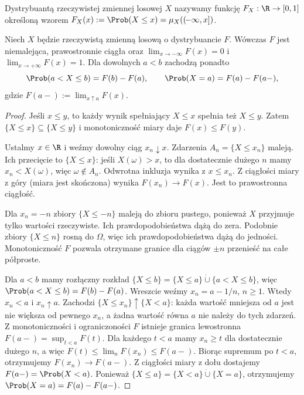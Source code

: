 \begin{definicja}
Dystrybuantą rzeczywistej zmiennej losowej $X$ nazywamy funkcję
$F_X:\R\to[0,1]$ określoną wzorem
$F_X(x):=\Prob(X\leq x)=\mu_X((\! -\infty,x])$.
\end{definicja}

\begin{twierdzenie}
Niech $X$ będzie rzeczywistą zmienną losową o dystrybuancie $F$.
Wówczas $F$ jest niemalejąca, prawostronnie ciągła oraz
$\lim_{x\to-\infty}F(x)=0$ i $\lim_{x\to+\infty}F(x)=1$.
Dla dowolnych $a<b$ zachodzą ponadto
\[
\Prob(a<X\leq b)=F(b)-F(a),\qquad
\Prob(X=a)=F(a)-F(a-),
\]
gdzie $F(a-):=\lim_{x\uparrow a}F(x)$.
\end{twierdzenie}
\begin{proof}
Jeśli $x\leq y$, to każdy wynik spełniający $X\leq x$
spełnia też $X\leq y$. Zatem
$\{X\leq x\}\subseteq\{X\leq y\}$ i monotoniczność
miary daje $F(x)\leq F(y)$.

Ustalmy $x\in\R$ i weźmy dowolny ciąg $x_n\downarrow x$.
Zdarzenia $A_n=\{X\leq x_n\}$ maleją. Ich przecięcie
to $\{X\leq x\}$: jeśli $X(\omega)>x$, to dla
dostatecznie dużego $n$ mamy $x_n<X(\omega)$,
więc $\omega\notin A_n$. Odwrotna inkluzja wynika z
$x\leq x_n$. Z ciągłości miary z góry (miara jest skończona)
wynika $F(x_n)\to F(x)$. Jest to prawostronna ciągłość.

Dla $x_n=-n$ zbiory $\{X\leq-n\}$ maleją
do zbioru pustego, ponieważ $X$ przyjmuje tylko
wartości rzeczywiste. Ich prawdopodobieństwa dążą do zera.
Podobnie zbiory $\{X\leq n\}$ rosną do $\Omega$,
więc ich prawdopodobieństwa dążą do jedności.
Monotoniczność $F$ pozwala otrzymane granice dla
ciągów $\pm n$ przenieść na całe półproste.

Dla $a<b$ mamy rozłączny rozkład
$\{X\leq b\}=\{X\leq a\}\mathbin{\dot\cup}
\{a<X\leq b\}$, więc
$\Prob(a<X\leq b)=F(b)-F(a)$.
Wreszcie weźmy $x_n=a-1/n$, $n\geq1$. Wtedy $x_n<a$
i $x_n\uparrow a$. Zachodzi
$\{X\leq x_n\}\uparrow\{X<a\}$: każda wartość mniejsza od $a$
jest nie większa od pewnego $x_n$, a żadna wartość równa $a$
nie należy do tych zdarzeń.
Z monotoniczności i ograniczoności $F$ istnieje granica
lewostronna $F(a-)=\sup_{t<a}F(t)$. Dla każdego $t<a$
mamy $x_n\geq t$ dla dostatecznie dużego $n$, a więc
$F(t)\leq\lim_n F(x_n)\leq F(a-)$. Biorąc supremum po $t<a$,
otrzymujemy $F(x_n)\to F(a-)$. Z ciągłości miary z dołu dostajemy
$F(a-)=\Prob(X<a)$. Ponieważ
$\{X\leq a\}=\{X<a\}\mathbin{\dot\cup}\{X=a\}$,
otrzymujemy $\Prob(X=a)=F(a)-F(a-)$.
\end{proof}

